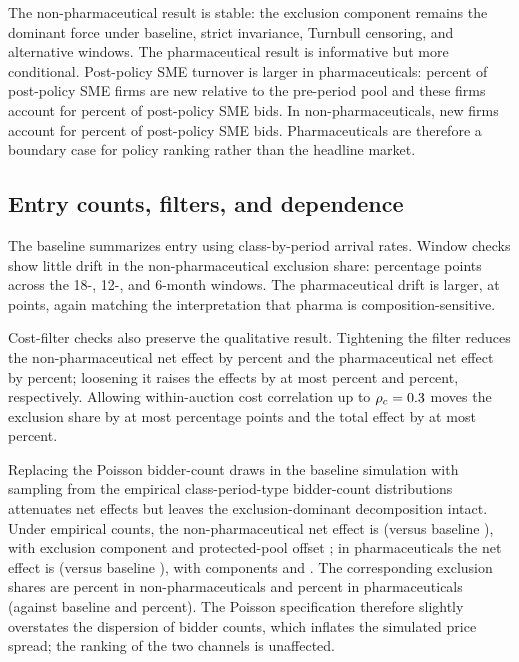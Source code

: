 \documentclass[12pt]{article}
\begin{document}
The non-pharmaceutical result is stable: the exclusion component remains the
dominant force under baseline, strict invariance, Turnbull censoring, and
alternative windows. The pharmaceutical result is informative but more
conditional. Post-policy SME turnover is larger in pharmaceuticals:
\turnoverPhPctNewFirms{} percent of post-policy SME firms are new relative to
the pre-period pool and these firms account for \turnoverPhPctNewBids{} percent
of post-policy SME bids. In non-pharmaceuticals, new firms account for
\turnoverNpPctNewBids{} percent of post-policy SME bids. Pharmaceuticals are
therefore a boundary case for policy ranking rather than the headline market.

\subsection{Entry counts, filters, and dependence}

The baseline summarizes entry using class-by-period arrival rates. Window
checks show little drift in the non-pharmaceutical exclusion share:
\windowShareDriftNp{} percentage points across the 18-, 12-, and 6-month
windows. The pharmaceutical drift is larger, at \windowShareDriftPh{} points,
again matching the interpretation that pharma is composition-sensitive.

Cost-filter checks also preserve the qualitative result. Tightening the
filter reduces the non-pharmaceutical net effect by \filterTightDropNp{}
percent and the pharmaceutical net effect by \filterTightDropPh{}
percent; loosening it raises the effects by at most \filterLooseUpNp{}
percent and \filterLooseUpPh{} percent, respectively. Allowing
within-auction cost correlation up to \(\rho_c=0.3\) moves the
exclusion share by at most \ipvShareDriftPp{} percentage points and the
total effect by at most \ipvTotalDriftPct{} percent.

Replacing the Poisson bidder-count draws in the baseline simulation with
sampling from the empirical class-period-type bidder-count distributions
attenuates net effects but leaves the exclusion-dominant decomposition
intact. Under empirical counts, the non-pharmaceutical net effect is
\bneEffEmpTotalNp{} (versus baseline \bneEffectTotalNp{}), with
exclusion component \bneEffEmpIntensNp{} and protected-pool offset
\bneEffEmpEntryNp{}; in pharmaceuticals the net effect is
\bneEffEmpTotalPh{} (versus baseline \bneEffectTotalPh{}), with
components \bneEffEmpIntensPh{} and \bneEffEmpEntryPh{}. The
corresponding exclusion shares are \bneEffEmpShareNp{} percent in
non-pharmaceuticals and \bneEffEmpSharePh{} percent in pharmaceuticals
(against baseline \bneShareIntensNp{} and \bneShareIntensPh{} percent).
The Poisson specification therefore slightly overstates the dispersion
of bidder counts, which inflates the simulated price spread; the ranking
of the two channels is unaffected.
\end{document}
